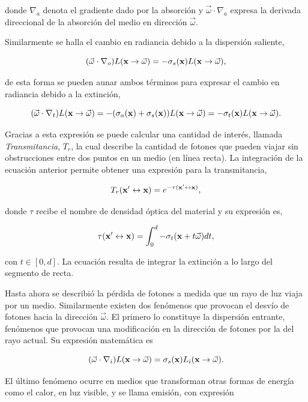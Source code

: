 \noindent donde $\nabla_{a}$ denota el gradiente dado por la absorción y $ \vec{\omega} \cdot \nabla_{a}$ expresa la derivada direccional de la absorción del medio en dirección $\vec{\omega}$.

Similarmente se halla el cambio en radiancia debido a la dispersión saliente,

$$ (\vec{\omega} \cdot \nabla_{o}) L(\bold{x} \rightarrow \vec{\omega}) = -\sigma_{s}(\bold{x}) L(\bold{x} \rightarrow \vec{\omega}),$$

\noindent  de esta forma se pueden aunar ambos términos para expresar el cambio en radiancia debido a la extinción,

$$(\vec{\omega} \cdot \nabla_{t}) L(\bold{x} \rightarrow \vec{\omega}) = -(\sigma_{a}(\bold{x})+\sigma_{s}(\bold{x})) L(\bold{x} \rightarrow \vec{\omega}) = -\sigma_{t}(\bold{x}) L(\bold{x} \rightarrow \vec{\omega}).$$

Gracias a esta expresión se puede calcular una cantidad de interés, llamada {\em Transmitancia}, $T_{r}$, la cual describe la cantidad de fotones que pueden viajar sin obstrucciones entre dos puntos en un medio (en línea recta).
La integración de la ecuación anterior permite obtener una expresión para la transmitancia,

$$T_{r}(\bold{x'} \leftrightarrow \bold{x}) = e^{-\tau(\bold{x'} \leftrightarrow \bold{x})},$$

\noindent donde $\tau$ recibe el nombre de densidad óptica del material y su expresión es,

$$\tau(\bold{x'} \leftrightarrow \bold{x}) = \int_{0}^{d} -\sigma_{t}(\bold{x}+t\vec{\omega})dt,$$

\noindent con $t \in [0,d]$.
La ecuación resulta de integrar la extinción a lo largo del segmento de recta.


Hasta ahora se describió la pérdida de fotones a medida que un rayo de luz viaja por un medio.
Similarmente existen dos fenómenos que provocan el desvío de fotones hacia la dirección $\vec{\omega}$.
El primero lo constituye la dispersión entrante, fenómenos que provocan una modificación en la dirección de fotones por la del rayo actual.
Su expresión matemática es

$$ (\vec{\omega} \cdot \nabla_{i}) L(\bold{x} \rightarrow \vec{\omega}) = \sigma_{s}(\bold{x}) L_{i}(\bold{x} \rightarrow \vec{\omega}).$$

El último fenómeno ocurre en medios que transforman otras formas de energía como el calor, en luz visible, y se llama emisión, con expresión

